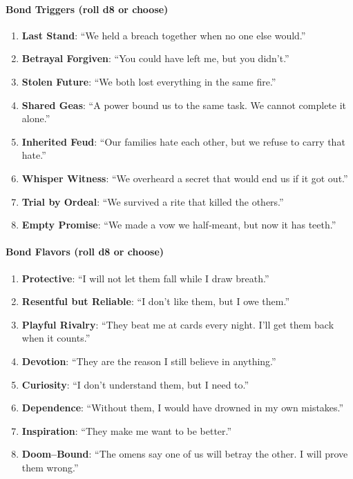 \paragraph{Bond Triggers (roll d8 or choose)}
\begin{enumerate}
\item \textbf{Last Stand}: “We held a breach together when no one else would.”
\item \textbf{Betrayal Forgiven}: “You could have left me, but you didn’t.”
\item \textbf{Stolen Future}: “We both lost everything in the same fire.”
\item \textbf{Shared Geas}: “A power bound us to the same task. We cannot complete it alone.”
\item \textbf{Inherited Feud}: “Our families hate each other, but we refuse to carry that hate.”
\item \textbf{Whisper Witness}: “We overheard a secret that would end us if it got out.”
\item \textbf{Trial by Ordeal}: “We survived a rite that killed the others.”
\item \textbf{Empty Promise}: “We made a vow we half‑meant, but now it has teeth.”
\end{enumerate}

\paragraph{Bond Flavors (roll d8 or choose)}
\begin{enumerate}
\item \textbf{Protective}: “I will not let them fall while I draw breath.”
\item \textbf{Resentful but Reliable}: “I don’t like them, but I owe them.”
\item \textbf{Playful Rivalry}: “They beat me at cards every night. I’ll get them back when it counts.”
\item \textbf{Devotion}: “They are the reason I still believe in anything.”
\item \textbf{Curiosity}: “I don’t understand them, but I need to.”
\item \textbf{Dependence}: “Without them, I would have drowned in my own mistakes.”
\item \textbf{Inspiration}: “They make me want to be better.”
\item \textbf{Doom–Bound}: “The omens say one of us will betray the other. I will prove them wrong.”
\end{enumerate}

